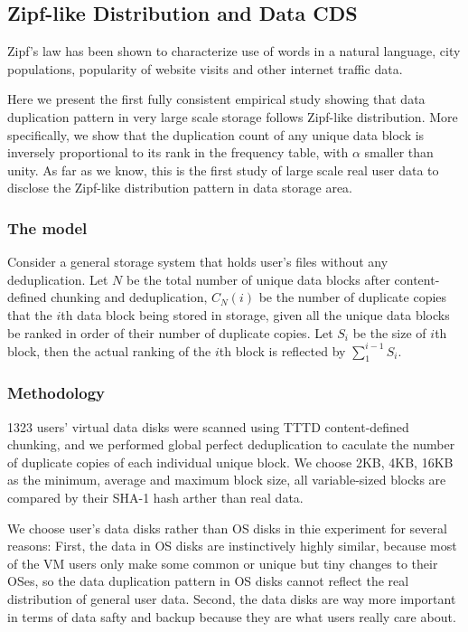 \subsection{Zipf-like Distribution and Data CDS}
Zipf's law has been shown to characterize use of words in a natural language, city populations, 
popularity of website visits and other internet traffic data.

Here we present the first fully consistent empirical study showing that data duplication
pattern in very large scale storage follows Zipf-like distribution. More specifically,
we show that the duplication count of any unique data block is inversely proportional to its rank
in the frequency table, with $\alpha$ smaller than unity. 
As far as we know, this is the first study of large scale real user data to disclose
the Zipf-like distribution pattern in data storage area.

\subsubsection{The model}
Consider a general storage system that holds user's files without any deduplication. 
Let $N$ be the total number of unique data blocks after 
content-defined chunking and deduplication, 
$C_N(i)$ be the number of duplicate copies that the $i$th data block being
stored in storage, given all the unique data blocks be ranked in order of their number of duplicate copies.
Let $S_i$ be the size of $i$th block,
then the actual ranking of the $i$th block is reflected by $\sum_{1}^{i-1}S_i$. 

\subsubsection{Methodology}
1323 users' virtual data disks were scanned using TTTD content-defined chunking, and we performed global perfect deduplication 
to caculate the number of duplicate copies of each individual unique block. We choose 2KB, 4KB, 16KB as the minimum, average
and maximum block size, all variable-sized blocks are compared by their SHA-1 hash arther than real data.

We choose user's data disks rather than OS disks in thie experiment for several reasons: First, the data in OS disks are 
instinctively highly similar, because most of the VM users only make some common or unique but tiny changes to their OSes,
so the data duplication pattern in OS disks cannot reflect the real distribution of general user data.
Second, the data disks are way more important in terms of data safty and backup because they are 
what users really care about.

